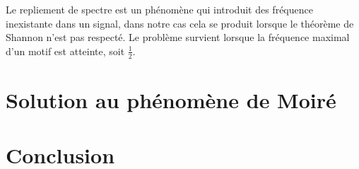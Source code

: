 \documentclass[a4paper,11pt]{article}
\begin{document}
  Le repliement de spectre est un phénomène qui introduit des fréquence inexistante dans un signal, dans notre cas cela se produit lorsque le théorème de Shannon n’est pas respecté.
  Le problème survient lorsque la fréquence maximal d’un motif est atteinte, soit $\frac{1}{2}$.\\

  \section{Solution au phénomène de Moiré}
  
  \section{Conclusion}
  
\end{document}
